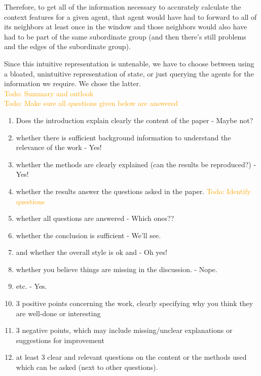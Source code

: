 \documentclass[letterpaper]{article}
\newcommand\todo[1]{\textcolor{orange}{Todo: #1}}
\begin{document}
Therefore, to get all of the information necessary to accurately calculate the context features for a given agent, that agent would have had to forward to all of its neighbors at least once in the window and those neighbors would also have had to be part of the same subordinate group (and then there’s still problems and the edges of the subordinate group).

Since this intuitive representation is untenable, we have to choose between using a bloated, unintuitive representation of state, or just querying the agents for the information we require.  We chose the latter.
\\\todo{Summary and outlook}
\\\todo{Make sure all questions given below are answered}
\begin{enumerate}
 \item Does the introduction explain clearly the content of the paper - Maybe not?
 \item whether there is sufficient background information to understand the relevance of the work - Yes!
 \item whether the methods are clearly explained (can the results be reproduced?) - Yes!
 \item whether the results answer the questions asked in the paper. \todo{Identify questions}
 \item whether all questions are answered - Which ones??
 \item whether the conclusion is sufficient - We'll see.
 \item and whether the overall style is ok and - Oh yes!
 \item whether you believe things are missing in the discussion. - Nope.
 \item etc. - Yes.
 \item 3 positive points concerning the work, clearly specifying why you think they are well-done or interesting
 \item 3 negative points, which may include missing/unclear explanations or suggestions for improvement
 \item at least 3 clear and relevant questions on the content or the methods used which can be asked (next to other questions).
\end{enumerate}

\footnotesize


\end{document}
